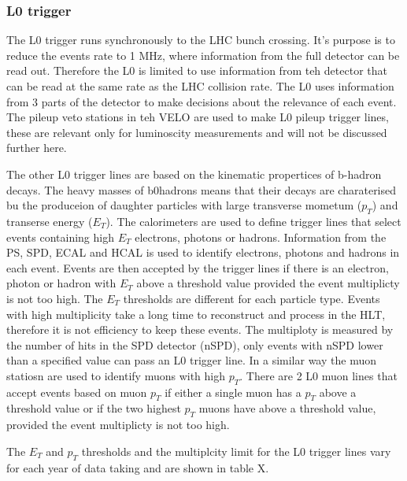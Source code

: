 \subsubsection{L0 trigger}

The L0 trigger runs synchronously to the LHC bunch crossing. It's purpose is to reduce the events rate to 1 MHz, where information from the full detector can be read out. Therefore the L0 is limited to use information from teh detector that can be read at the same rate as the LHC collision rate.
The L0 uses information from 3 parts of the detector to make decisions about the relevance of each event. The pileup veto stations in teh VELO are used to make L0 pileup trigger lines, these are relevant only for luminoscity measurements and will not be discussed further here.

The other L0 trigger lines are based on the kinematic propertices of b-hadron decays. The heavy masses of b0hadrons means that their decays are charaterised bu the produceion of daughter particles with large transverse mometum ($p_{T}$) and transerse energy ($E_{T}$).
The calorimeters are used to define trigger lines that select events containing high $E_{T}$ electrons, photons or hadrons. Information from the PS, SPD, ECAL and HCAL is used to identify electrons, photons and hadrons in each event. Events are then accepted by the trigger lines if there is an  electron, photon or hadron with $E_{T}$ above a threshold value provided the event multiplicty is not too high. The $E_{T}$ thresholds are different for each particle type. Events with high multiplicity take a long time to reconstruct and process in the HLT, therefore it is not efficiency to keep these events. The multiploty is measured by the number of hits in the SPD detector (nSPD), only events with nSPD lower than a specified value can pass an L0 trigger line. 
In a similar way the muon statiosn are used to identify muons with high $p_{T}$. There are 2 L0 muon lines that accept events based on muon $p_{T}$ if either a single muon has a $p_{T}$  above a threshold value or if the two highest $p_{T}$  muons have above a threshold value, provided the event multiplicty is not too high. %

The  $E_{T}$ and $p_{T}$ thresholds and the multiplcity limit for the L0 trigger lines vary for each year of data taking and are shown in table X. 


